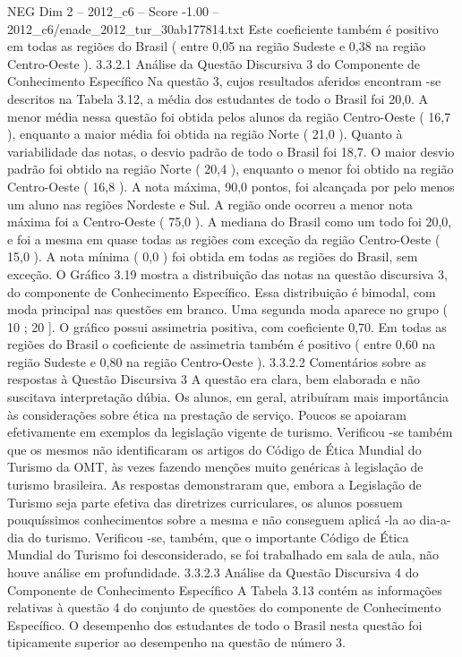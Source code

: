 \begin{textsample}{NEG Dim 2 – 2012\_c6 – Score -1.00 – 2012\_c6/enade\_2012\_tur\_30ab177814.txt}
Este coeficiente também é positivo em todas as regiões do Brasil ( entre 0,05 na região Sudeste e 0,38 na região Centro-Oeste ). 3.3.2.1 Análise da Questão Discursiva 3 do Componente de Conhecimento Específico Na questão 3, cujos resultados aferidos encontram -se descritos na Tabela 3.12, a média dos estudantes de todo o Brasil foi 20,0.
A menor média nessa questão foi obtida pelos alunos da região Centro-Oeste ( 16,7 ), enquanto a maior média foi obtida na região Norte ( 21,0 ).
Quanto à variabilidade das notas, o desvio padrão de todo o Brasil foi 18,7.
O maior desvio padrão foi obtido na região Norte ( 20,4 ), enquanto o menor foi obtido na região Centro-Oeste ( 16,8 ).
A nota máxima, 90,0 pontos, foi alcançada por pelo menos um aluno nas regiões Nordeste e Sul.
A região onde ocorreu a menor nota máxima foi a Centro-Oeste ( 75,0 ).
A mediana do Brasil como um todo foi 20,0, e foi a mesma em quase todas as regiões com exceção da região Centro-Oeste ( 15,0 ).
A nota mínima ( 0,0 ) foi obtida em todas as regiões do Brasil, sem exceção.
O Gráfico 3.19 mostra a distribuição das notas na questão discursiva 3, do componente de Conhecimento Específico.
Essa distribuição é bimodal, com moda principal nas questões em branco.
Uma segunda moda aparece no grupo ( 10 ; 20 ].
O gráfico possui assimetria positiva, com coeficiente 0,70.
Em todas as regiões do Brasil o coeficiente de assimetria também é positivo ( entre 0,60 na região Sudeste e 0,80 na região Centro-Oeste ). 3.3.2.2 Comentários sobre as respostas à Questão Discursiva 3 A questão era clara, bem elaborada e não suscitava interpretação dúbia.
Os alunos, em geral, atribuíram mais importância às considerações sobre ética na prestação de serviço.
Poucos se apoiaram efetivamente em exemplos da legislação vigente de turismo.
Verificou -se também que os mesmos não identificaram os artigos do Código de Ética Mundial do Turismo da OMT, às vezes fazendo menções muito genéricas à legislação de turismo brasileira.
As respostas demonstraram que, embora a Legislação de Turismo seja parte efetiva das diretrizes curriculares, os alunos possuem pouquíssimos conhecimentos sobre a mesma e não conseguem aplicá -la ao dia-a-dia do turismo.
Verificou -se, também, que o importante Código de Ética Mundial do Turismo foi desconsiderado, se foi trabalhado em sala de aula, não houve análise em profundidade. 3.3.2.3 Análise da Questão Discursiva 4 do Componente de Conhecimento Específico A Tabela 3.13 contém as informações relativas à questão 4 do conjunto de questões do componente de Conhecimento Específico.
O desempenho dos estudantes de todo o Brasil nesta questão foi tipicamente superior ao desempenho na questão de número 3.

\end{textsample}
